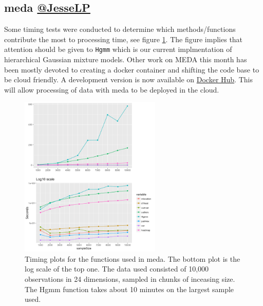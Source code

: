 \documentclass[simplex.tex]{subfiles}
\begin{document}
\subsection[meda]{meda \href{https://github.com/mrae}{@JesseLP}}


Some timing tests were conducted to determine which methods/functions
contribute the most to processing time, see figure
\ref{fig:medaTimeTest}.  The figure implies that attention should be
given to \verb+Hgmm+ which is our current implmentation of hierarchical
Gaussian mixture models. 
Other work on MEDA this month has been mostly devoted to creating a docker
container and shifting the code base to be cloud friendly. 
A development version is  now available on
\href{https://hub.docker.com/r/neurodata/meda/}{Docker Hub}.  
This will allow processing of data with meda to be deployed in the cloud.  


\begin{figure}[!h]
\begin{cframed}
\centering
\includegraphics[width=0.6\textwidth]{../../figs/medaTimeTest.png}
\caption{Timing plots for the functions used in meda.  The bottom plot
  is the log scale of the top one. The data used consisted of 10,000
  observations in 24 dimensions, sampled in chunks of inceasing size.
  The Hgmm function takes about 10 minutes  on the largest sample used.}
\label{fig:medaTimeTest}
\end{cframed}
\end{figure}





\clearpage
\end{document}
